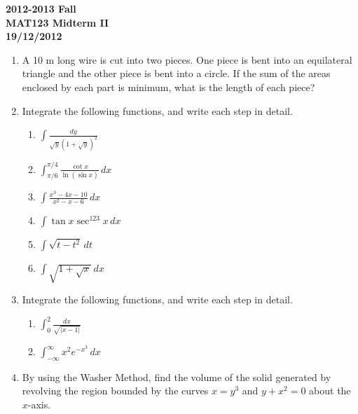 \documentclass[a4paper, 12pt]{article}
\begin{document}
\newpage
{}
{}

\begin{center}
\textbf{2012-2013 Fall \\MAT123 Midterm II\\19/12/2012}
\end{center}

\begin{enumerate}[leftmargin=*,label=\textbf{\arabic*.}]

\item A 10 m long wire is cut into two pieces. One piece is bent into an equilateral triangle and the other piece is bent into a circle. If the sum of the areas enclosed by each part is minimum, what is the length of each piece?

\item Integrate the following functions, and write each step in detail.

\begin{enumerate}[leftmargin=*,label=\textbf{\alph*.}]
\item $\displaystyle\int\frac{dy}{\sqrt{y}\left(1+\sqrt y\right)^2}$
\item $\displaystyle\int_{\pi/6}^{\pi/4}\frac{\cot x}{\ln(\sin x)}\,dx$
\item $\displaystyle\int\frac{x^3-4x-10}{x^2-x-6}\,dx$
\item $\displaystyle \int\tan x \sec^{123}x\,dx$
\item $\displaystyle\int\sqrt{t-t^2}\,dt$
\item $\displaystyle\int\sqrt{1+\sqrt x}\,dx$
\end{enumerate}

\item Integrate the following functions, and write each step in detail.

\begin{enumerate}[leftmargin=*,label=\textbf{\alph*.}]
\item $\displaystyle \int_0^2\frac{dx}{\sqrt{|x-1|}}$
\item $\displaystyle\int_{-\infty}^{\infty}x^2 e^{-x^3}\,dx$
\end{enumerate}

\item By using the Washer Method, find the volume of the solid generated by revolving the region bounded by the curves $x=y^3$ and $y+x^2=0$ about the $x$-axis.
\end{enumerate}
\end{document}
